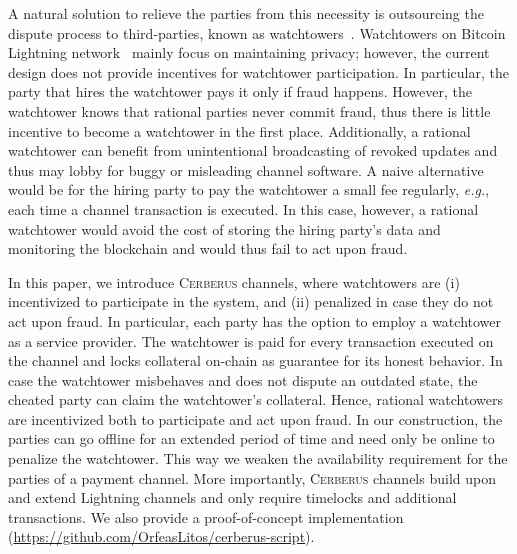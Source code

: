 \documentclass[runningheads]{llncs}
\newcommand{\eg}{{\em e.g.}}
\newcommand{\sys}{\textsc{Cerberus}\xspace}
\begin{document}
A natural solution to relieve the parties from this necessity is outsourcing the dispute process to third-parties, known as watchtowers~\cite{watchtowers,dryja2016monitors}.
Watchtowers on Bitcoin Lightning network~\cite{poon2015lightning} mainly focus on maintaining privacy; however, the current design does not provide incentives for watchtower participation.
In particular, the party that hires the watchtower pays it only if fraud happens. However, the watchtower knows that rational parties never commit fraud, thus there is little incentive to become a watchtower in the first place. Additionally, a rational watchtower can benefit from unintentional broadcasting of revoked updates and thus may lobby for buggy or misleading channel software. A naive alternative would be for the hiring party to pay the watchtower a small fee regularly, \eg, each time a channel transaction is executed. In this case, however, a rational watchtower would avoid the cost of storing the hiring party's data and monitoring the blockchain and would thus fail to act upon fraud.

In this paper, we introduce \sys channels, where watchtowers are (i) incentivized to participate in the system, and (ii) penalized in case they do not act upon fraud.
In particular,
each party has the option to employ a watchtower as a service provider. The watchtower  is paid for every transaction executed on the channel and locks collateral on-chain as guarantee for its honest behavior. In case the watchtower misbehaves and does not dispute an outdated state, the cheated party can claim the watchtower's collateral.
Hence, rational watchtowers are incentivized both to participate and act upon fraud.
In our construction, the parties can go offline for an extended period of time and need only be online to penalize the watchtower.
This way we weaken the availability requirement for the parties of a payment channel.
More importantly, \sys channels build upon and extend Lightning channels and only require timelocks and additional transactions.%
We also provide a proof-of-concept implementation (\url{https://github.com/OrfeasLitos/cerberus-script}).
\end{document}
